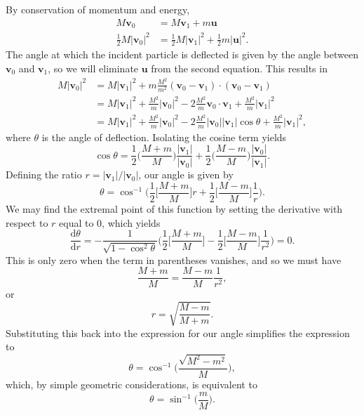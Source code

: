 \documentclass[../feynman-lectures-on-physics.tex]{subfiles}
\begin{document}
\begin{questions}
\begin{solution}
    By conservation of momentum and energy,
    \begin{align*}
      M\mathbf{v}_0 &= M\mathbf{v}_1 + m\mathbf{u} \\
      \frac{1}{2}M|\mathbf{v}_0|^2 &= \frac{1}{2}M|\mathbf{v}_1|^2 + \frac{1}{2}m|\mathbf{u}|^2.
    \end{align*}
    The angle at which the incident particle is deflected is given by the angle
    between $\mathbf{v}_0$ and $\mathbf{v}_1$, so we will eliminate $\mathbf{u}$
    from the second equation. This results in
    \begin{align*}
      M|\mathbf{v}_0|^2 &= M|\mathbf{v}_1|^2 + m\frac{M^2}{m^2}(\mathbf{v}_0-\mathbf{v}_1)\cdot(\mathbf{v}_0-\mathbf{v}_1) \\
                        &= M|\mathbf{v}_1|^2 + \frac{M^2}{m}|\mathbf{v}_0|^2 - 2\frac{M^2}{m}\mathbf{v}_0\cdot\mathbf{v}_1 + \frac{M^2}{m}|\mathbf{v}_1|^2 \\
                        &= M|\mathbf{v}_1|^2 + \frac{M^2}{m}|\mathbf{v}_0|^2 - 2\frac{M^2}{m}|\mathbf{v}_0||\mathbf{v}_1|\cos\theta + \frac{M^2}{m}|\mathbf{v}_1|^2,
    \end{align*}
    where $\theta$ is the angle of deflection. Isolating the cosine term yields
    \[
      \cos\theta =
      \frac{1}{2}\Big(\frac{M + m}{M}\Big)\frac{|\mathbf{v}_1|}{|\mathbf{v}_0|} +
      \frac{1}{2}\Big(\frac{M - m}{M}\Big)\frac{|\mathbf{v}_0|}{|\mathbf{v}_1|}.
    \]
    Defining the ratio $r = |\mathbf{v}_1|/|\mathbf{v}_0|$, our angle is given
    by
    \[
      \theta = \cos^{-1}\Big(\frac{1}{2}\Big[\frac{M+m}{M}\Big]r + \frac{1}{2}\Big[\frac{M-m}{M}\Big]\frac{1}{r}\Big).
    \]
    We may find the extremal point of this function by setting the derivative
    with respect to $r$ equal to $0$, which yields
    \[
      \frac{\mathrm{d}\theta}{\mathrm{d}r} =
      -\frac{1}{\sqrt{1-\cos^2\theta}}\Big(\frac{1}{2}\Big[\frac{M+m}{M}\Big] -
      \frac{1}{2}\Big[\frac{M-m}{M}\Big]\frac{1}{r^2}\Big) = 0.
    \]
    This is only zero when the term in parentheses vanishes, and so we
    must have
    \[
      \frac{M+m}{M} = \frac{M-m}{M}\frac{1}{r^2},
    \]
    or
    \[
      r = \sqrt{\frac{M-m}{M+m}}.
    \]
    Substituting this back into the expression for our angle simplifies the
    expression to
    \[
      \theta = \cos^{-1}\Big(\frac{\sqrt{M^2-m^2}}{M}\Big),
    \]
    which, by simple geometric considerations, is equivalent to
    \[
      \theta = \sin^{-1}\Big(\frac{m}{M}\Big).
    \]
  \end{solution}


\end{questions}
\end{document}
